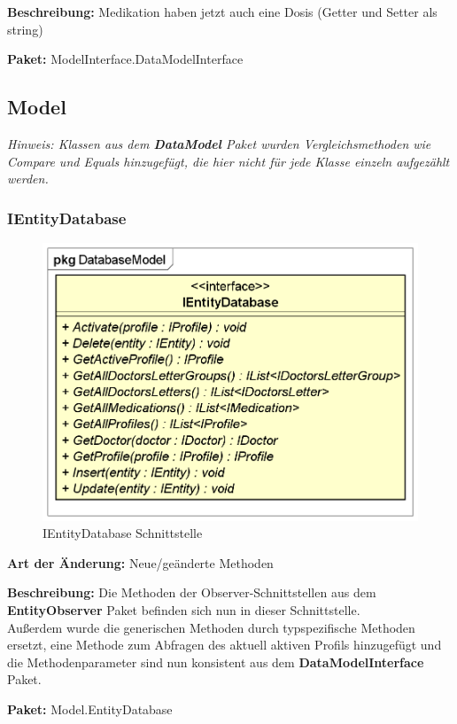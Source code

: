 \documentclass[a4paper]{scrreprt}
\begin{document}
\textbf{Beschreibung:} Medikation haben jetzt auch eine Dosis (Getter und Setter als string)

\textbf{Paket:} ModelInterface.DataModelInterface

\subsection{Model}
\textit{Hinweis: Klassen aus dem \textbf{DataModel} Paket wurden Vergleichsmethoden wie Compare und Equals hinzugefügt, die hier nicht für jede Klasse einzeln aufgezählt werden.}

\subsubsection{IEntityDatabase}
\begin{figure}[H]
\centering
\includegraphics[width=0.75\textheight]{graphics/Klassendiagramme/Model/IEntityDatabase.png}
\caption{IEntityDatabase Schnittstelle}
\end{figure}
\textbf{Art der Änderung:} Neue/geänderte Methoden

\textbf{Beschreibung:} Die Methoden der Observer-Schnittstellen aus dem \textbf{EntityObserver} Paket befinden sich nun in dieser Schnittstelle. \\
Außerdem wurde die generischen Methoden durch typspezifische Methoden ersetzt, eine Methode zum Abfragen des aktuell aktiven Profils hinzugefügt und die Methodenparameter sind nun konsistent aus dem \textbf{DataModelInterface} Paket.

\textbf{Paket:} Model.EntityDatabase
\end{document}
